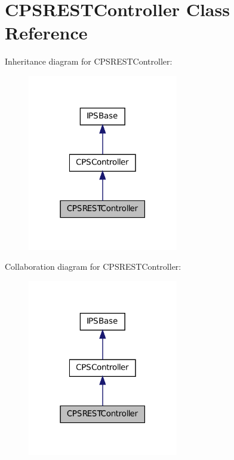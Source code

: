 \hypertarget{classCPSRESTController}{
\section{CPSRESTController Class Reference}
\label{classCPSRESTController}
}


Inheritance diagram for CPSRESTController:\nopagebreak
\begin{figure}[H]
\begin{center}
\leavevmode
\includegraphics[width=186pt]{classCPSRESTController__inherit__graph}
\end{center}
\end{figure}


Collaboration diagram for CPSRESTController:\nopagebreak
\begin{figure}[H]
\begin{center}
\leavevmode
\includegraphics[width=186pt]{classCPSRESTController__coll__graph}
\end{center}
\end{figure}
